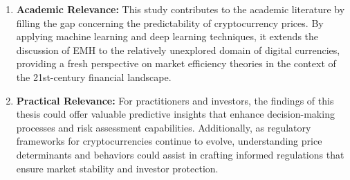 \begin{enumerate}
\item \textbf{Academic Relevance:} This study contributes to the academic literature by filling the gap concerning the predictability of cryptocurrency prices. 
By applying machine learning and deep learning techniques, it extends the discussion of EMH to the relatively unexplored domain of digital 
currencies, providing a fresh perspective on market efficiency theories in the context of the 21st-century financial landscape.

\item \textbf{Practical Relevance:} For practitioners and investors, the findings of this thesis could offer valuable predictive insights that enhance decision-making processes and risk assessment capabilities. Additionally, as regulatory frameworks for cryptocurrencies continue to evolve, understanding price determinants and behaviors could assist in crafting informed regulations that ensure market stability and investor protection.
\end{enumerate}